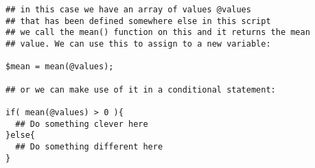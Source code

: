\documentclass[11pt]{article}
\renewcommand\scriptsize\normalsize
\begin{document}
\begin{verbatim}
## in this case we have an array of values @values
## that has been defined somewhere else in this script
## we call the mean() function on this and it returns the mean
## value. We can use this to assign to a new variable:

$mean = mean(@values);

## or we can make use of it in a conditional statement:

if( mean(@values) > 0 ){
  ## Do something clever here
}else{
  ## Do something different here
}
\end{verbatim}
\end{document}

